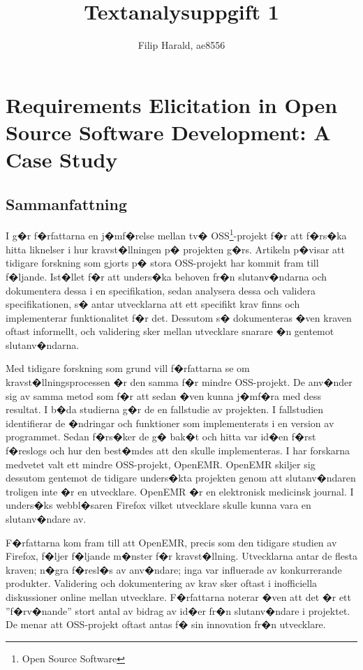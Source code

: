 \documentclass[11pt, oneside]{article}   	%
\title{Textanalysuppgift 1}
\author{Filip Harald, ae8556}
\begin{document}
\maketitle
\tableofcontents

\newpage
\section{Requirements Elicitation in Open Source Software Development: A Case Study}
\subsection{Sammanfattning}
I \cite{Noll2010} g�r f�rfattarna en j�mf�relse mellan tv� OSS\footnote{Open Source Software}-projekt f�r att f�rs�ka hitta liknelser i hur kravst�llningen p� projekten g�rs. Artikeln p�visar att tidigare forskning som gjorts p� stora OSS-projekt har kommit fram till f�ljande. Ist�llet f�r att unders�ka behoven fr�n slutanv�ndarna och dokumentera dessa i en specifikation, sedan analysera dessa och validera specifikationen, s� antar utvecklarna att ett specifikt krav finns och implementerar funktionalitet f�r det. Dessutom s� dokumenteras �ven kraven oftast informellt, och validering sker mellan utvecklare snarare �n gentemot slutanv�ndarna.

Med tidigare forskning som grund vill f�rfattarna se om kravst�llningsprocessen �r den samma f�r mindre OSS-projekt. De anv�nder sig av samma metod som \cite{Noll2008} f�r att sedan �ven kunna j�mf�ra med dess resultat. I b�da studierna g�r de en fallstudie av projekten. I fallstudien identifierar de �ndringar och funktioner som implementerats i en version av programmet. Sedan f�rs�ker de g� bak�t och hitta var id�en f�rst f�reslogs och hur den best�mdes att den skulle  implementeras. I \cite{Noll2010} har forskarna medvetet valt ett mindre OSS-projekt, OpenEMR. OpenEMR skiljer sig dessutom gentemot de tidigare unders�kta projekten genom att slutanv�ndaren troligen inte �r en utvecklare. OpenEMR �r en elektronisk medicinsk journal. I \cite{Noll2008} unders�ks webbl�saren Firefox vilket utvecklare skulle kunna vara en slutanv�ndare av.

F�rfattarna kom fram till att OpenEMR, precis som den tidigare studien av Firefox, f�ljer f�ljande m�nster f�r kravst�llning. Utvecklarna antar de flesta kraven; n�gra f�resl�s av anv�ndare; inga var influerade av konkurrerande produkter. Validering och dokumentering av krav sker oftast i inofficiella diskussioner online mellan utvecklare. F�rfattarna noterar �ven att det �r ett ''f�rv�nande'' stort antal av bidrag av id�er fr�n slutanv�ndare i projektet. De menar att OSS-projekt oftast antas f� sin innovation fr�n utvecklare.
\end{document}
